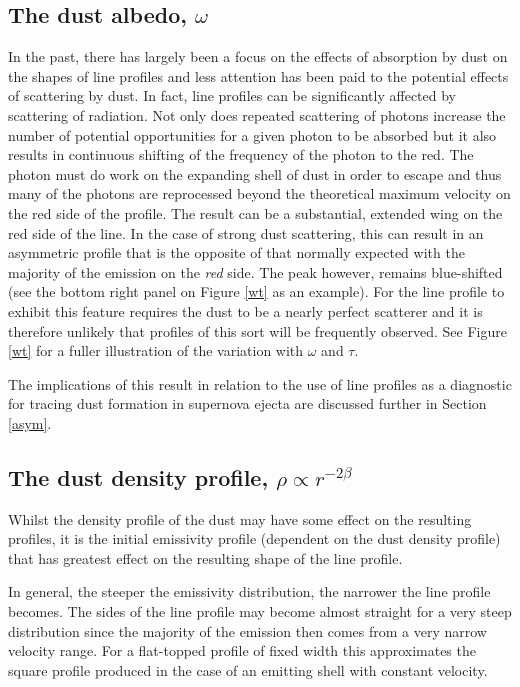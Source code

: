 \subsection{The dust albedo, $\omega$}
\label{omega}

In the past, there has largely been a focus on the effects of absorption by dust 
on the shapes of line profiles and less attention has been paid to the 
potential effects of scattering by dust.  In fact, line profiles 
can be significantly affected by scattering of radiation.  Not only does 
repeated scattering of photons increase the number of potential 
opportunities for a given photon to be absorbed but it also results in 
continuous shifting of the frequency of the photon to the red.  The photon 
must do work on the expanding shell of dust in order to escape and thus 
many of the photons are reprocessed beyond the theoretical maximum 
velocity on the red side of the profile.  The result can be a substantial, 
extended wing on the red side of the line.  In the case of strong 
dust scattering, this can result in an asymmetric profile that is the opposite 
of that normally expected with the majority of the emission on the 
\textit{red} side.  The peak however, remains blue-shifted (see the bottom right panel on Figure \ref{wt} as an example).  
For the line profile to exhibit this feature requires the dust to be a 
nearly perfect scatterer and it is therefore unlikely that profiles of this sort will be
frequently observed.  See Figure \ref{wt} for a fuller illustration of the variation
with $\omega$ and $\tau$.

The implications of this result in relation to the use of line profiles as 
a diagnostic for tracing dust formation in supernova ejecta 
are discussed further in Section \ref{asym}.


\subsection{The dust density profile, $\rho \propto r^{-2\beta}$}
\label{beta}

Whilst the density profile of the dust may have some effect on the 
resulting profiles, it is the initial emissivity profile (dependent on the 
dust density profile) that has greatest effect on the resulting shape of 
the line profile.

In general, the steeper the emissivity distribution, the narrower the line 
profile becomes.  The sides of the line profile may become almost straight 
for a very steep distribution since the majority of the emission then 
comes from a very narrow velocity range.  For a flat-topped profile of 
fixed width this approximates the square profile produced in the case of 
an emitting shell with constant velocity.

